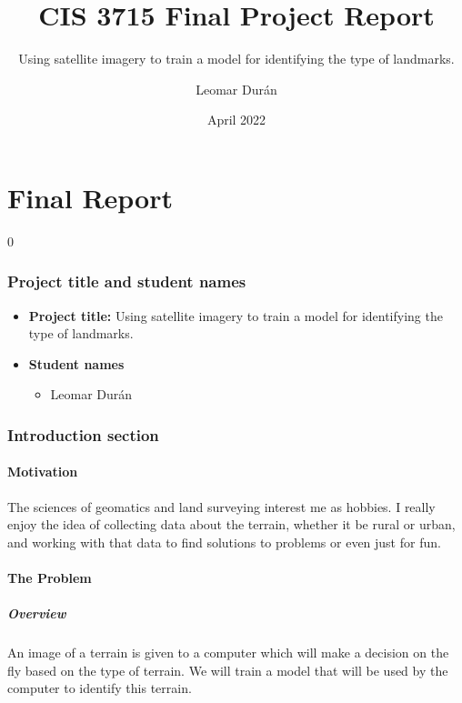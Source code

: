 \documentclass[11pt]{report}
\title{CIS 3715 Final Project Report}
\subtitle{Using satellite imagery to train a model for identifying the type of landmarks.}
\author{Leomar Durán}
\date{April 2022}
\let\oldpart\part%
\renewcommand*\part[1]{\oldpart{#1}\setcounter{section}0}%
\begin{document}
\maketitle

\part{Final Report}

\section*{Project title and student names}
\begin{itemize}
    \item
        \textbf{Project title:}
        Using satellite imagery to train a model for identifying the type of landmarks.
    \item
        \textbf{Student names} 
        \begin{itemize}
            \item
                Leomar Durán
        \end{itemize}
\end{itemize}

\section{Introduction section}

\subsection{Motivation}

The sciences of geomatics and land surveying interest me as hobbies.
I really enjoy the idea of collecting data about the terrain,
whether it be rural or urban,
and working with that data to find solutions to problems
or even just for fun.

\subsection{The Problem}

\subsubsection{Overview}

An image of a terrain is given to a computer which will make a decision on the fly based on the type of terrain.
We will train a model that will be used by the computer to identify this terrain.
\end{document}

